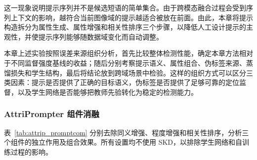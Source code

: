 这一现象说明提示序列并不是候选短语的简单集合。由于跨模态融合过程会受到序列上下文的影响，越符合当前图像域的提示越适合被放在前面。由此，本章将提示构造拆分为属性生成、属性增强和相关性排序三个步骤，以降低人工设计提示的主观性，并使提示序列能够随数据域变化而自动调整。

本章上述实验按照误差来源组织分析，首先比较整体检测性能，确定本章方法相对于不同监督强度基线的收益；随后分别考察提示语义、属性组合、伪标签来源、蒸馏损失和学生结构，最后将结论放到跨域场景中检验。这样的组织方式可以区分三类因素：提示是否提供了正确的目标语义，伪标签是否提供了足够可靠的定位监督，以及学生网络是否能够把教师先验转化为稳定的检测能力。

\subsubsection{AttriPrompter 组件消融}

表~\ref{tab:attrip_promptcom} 分别去除同义增强、程度增强和相关性排序，分析三个组件的独立作用及组合效果。所有设置均不使用 SKD，以排除学生网络和自训练过程的影响。

\begin{table}[t]
\caption{AttriPrompter 组件消融}
\label{tab:attrip_promptcom}
\begin{center}
\end{center}
\vskip -0.15in
\end{table}



